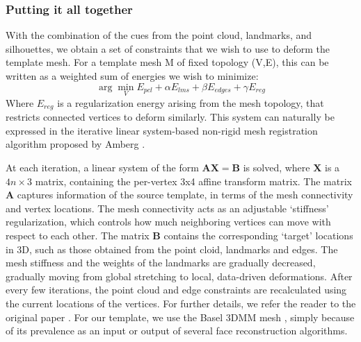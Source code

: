 \documentclass[10pt,twocolumn,letterpaper]{article}
\begin{document}
 \subsubsection{Putting it all together}
 With the combination of the cues from the point cloud, landmarks, and silhouettes, we obtain a set of constraints that we wish to use to deform the template mesh. For a template mesh M of fixed topology (V,E), this can be written as a weighted sum of energies we wish to minimize: 
 $$ \arg \min_{V}  E_{pcl} + \alpha E_{lms} + \beta E_{edges} +  \gamma E_{reg} $$
Where $E_{reg}$ is a regularization energy arising from the mesh topology, that restricts connected vertices to deform similarly. This system can naturally be expressed in the iterative linear system-based non-rigid mesh registration algorithm proposed by Amberg \etal \cite{amberg2007optimal}. 
 
 At each iteration, a linear system of the form $\mathbf{A}\mathbf{X} = \mathbf{B}$ is solved, where $\mathbf{X}$ is a $4n\times3$ matrix, containing the per-vertex 3x4 affine transform matrix. The matrix $\mathbf{A}$ captures information of the source template, in terms of the mesh connectivity and vertex locations. The mesh connectivity acts as an adjustable `stiffness' regularization, which controls how much neighboring vertices can move with respect to each other. The matrix 
 $\mathbf{B}$ contains the corresponding `target' locations in 3D, such as those obtained from the point cloid, landmarks and edges. The mesh stiffness and the weights of the landmarks are gradually decreased, gradually moving from global stretching to local, data-driven deformations. After every few iterations, the point cloud and edge constraints are recalculated using the current locations of the vertices. For further details, we refer the reader to the original paper \cite{amberg2007optimal}. For our template, we use the Basel 3DMM mesh \cite{blanz1999morphable}, simply because of its prevalence as an input or output of several face reconstruction algorithms.

\end{document}
